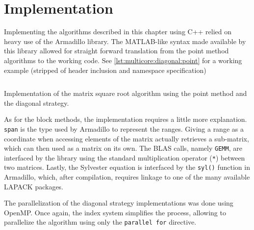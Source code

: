 \documentclass[../thesis]{subfiles}
\begin{document}
	\section{Implementation}
	Implementing the algorithms described in this chapter using C++ relied on heavy use of the Armadillo library. The MATLAB-like syntax made available by this library allowed for straight forward translation from the point method algorithms to the working code. See \cref{lst:multicore:diagonal:point} for a working example (stripped of header inclusion and namespace specification)

	\begin{listing}[htp]
		\inputminted[linenos,tabsize=4]{c++}{assets/code/multicore.diagonal.point.cpp}
		\caption[(Multicore) Point Diagonal Implementation]{Implementation of the matrix square root algorithm using the point method and the diagonal strategy.}
		\label{lst:multicore:diagonal:point}
	\end{listing}

	As for the block methods, the implementation requires a little more explanation. \texttt{span} is the type used by Armadillo to represent the ranges. Giving a range as a coordinate when accessing elements of the matrix actually retrieves a sub-matrix, which can then used as a matrix on its own. The BLAS calls, namely \texttt{GEMM}, are interfaced by the library using the standard multiplication operator (\texttt{*}) between two matrices. Lastly, the Sylvester equation is interfaced by the \texttt{syl()} function in Armadillo, which, after compilation, requires linkage to one of the many available LAPACK packages.

	The parallelization of the diagonal strategy implementations was done using OpenMP. Once again, the index system simplifies the process, allowing to parallelize the algorithm using only the \texttt{parallel for} directive.
\end{document}
